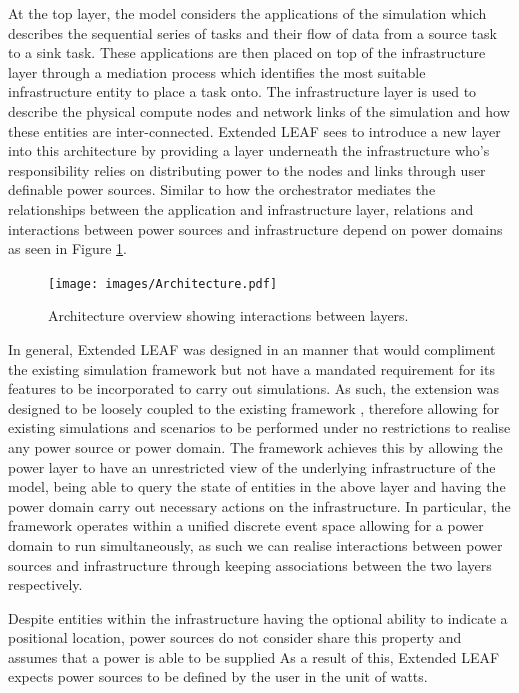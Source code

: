\documentclass{l4proj}
\begin{document}
At the top layer, the model considers the applications of the simulation which describes the sequential series of tasks and their flow of data from a source task to a sink task.
These applications are then placed on top of the infrastructure layer through a mediation process which identifies the most suitable infrastructure entity to place a task onto.
The infrastructure layer is used to describe the physical compute nodes and network links of the simulation and how these entities are inter-connected.
Extended LEAF sees to introduce a new layer into this architecture by providing a layer underneath the infrastructure who's responsibility relies on distributing power to the nodes and links through user definable power sources.
Similar to how the orchestrator mediates the relationships between the application and infrastructure layer, relations and interactions between power sources and infrastructure depend on power domains as seen in Figure \ref{fig:archtecture}.

\begin{figure}[htbp]
    \centering
    \texttt{[image: images/Architecture.pdf]}
    ~
    \caption{Architecture overview showing interactions between layers.}
    \label{fig:archtecture}
\end{figure}


In general, Extended LEAF was designed in an manner that would compliment the existing simulation framework but not have a mandated requirement for its features to be incorporated to carry out simulations.
As such, the extension was designed to be loosely coupled to the existing framework \citep{looseCoupling}, therefore allowing for existing simulations and scenarios to be performed under no restrictions to realise any power source or power domain.
The framework achieves this by allowing the power layer to have an unrestricted view of the underlying infrastructure of the model, being able to query the state of entities in the above layer and having the power domain carry out necessary actions on the infrastructure.
In particular, the framework operates within a unified discrete event space allowing for a power domain to run simultaneously, as such we can realise interactions between power sources and infrastructure through keeping associations between the two layers respectively.

Despite entities within the infrastructure having the optional ability to indicate a positional location, power sources do not consider share this property and assumes that a power is able to be supplied
As a result of this, Extended LEAF expects power sources to be defined by the user in the unit of watts.
\end{document}
